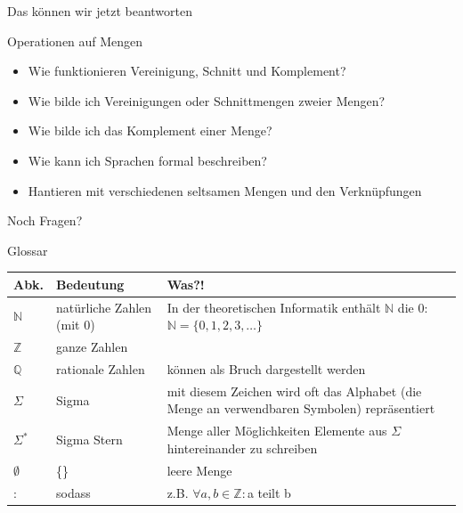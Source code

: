 \begin{frame}[fragile]{Das können wir jetzt beantworten}
    \begin{alertblock}{Operationen auf Mengen}
    \begin{itemize}
        \item Wie funktionieren Vereinigung, Schnitt und Komplement?
        \item Wie bilde ich Vereinigungen oder Schnittmengen zweier Mengen?
        \item Wie bilde ich das Komplement einer Menge?
        \item Wie kann ich Sprachen formal beschreiben?
        \item Hantieren mit verschiedenen seltsamen Mengen und den Verknüpfungen
    \end{itemize}
    \end{alertblock}
\end{frame}

\begin{frame}[standout]
  Noch Fragen?
\end{frame}

\begin{frame}[fragile]{Glossar}
    \small
    \begin{tabular}{p{} p{} p{}}
    \toprule
    Abk.&Bedeutung&Was?!\\
    \midrule
        $\mathbb{N}$&natürliche Zahlen (mit 0)&In der theoretischen Informatik enthält $\mathbb{N}$ die 0: $\mathbb{N}=\{0,1,2,3,\dots\}$\\
        $\mathbb{Z}$&ganze Zahlen&\\
        $\mathbb{Q}$&rationale Zahlen&können als Bruch dargestellt werden\\
        $\Sigma$ & Sigma& mit diesem Zeichen wird oft das Alphabet (die Menge an verwendbaren Symbolen) repräsentiert\\
        $\Sigma^\ast$&Sigma Stern&Menge aller Möglichkeiten Elemente aus $\Sigma$ hintereinander zu schreiben\\
        $\emptyset$&\{\}&leere Menge\\
        :&sodass&z.B. $\forall a,b\in\mathbb{Z}:$a teilt b\\
    \bottomrule
    \end{tabular}
\end{frame}

